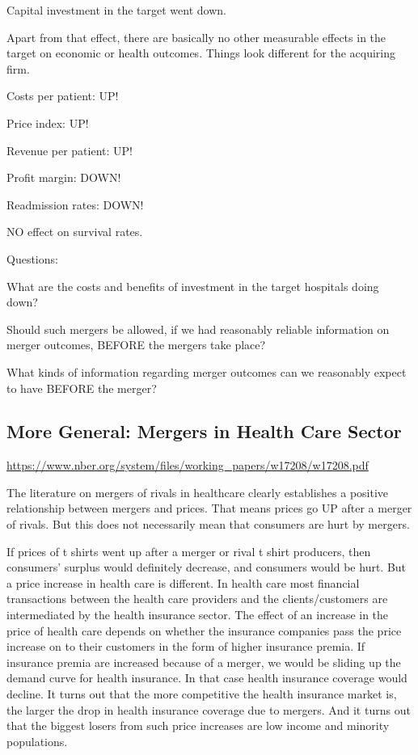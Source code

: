 \documentclass[
]{book}
\begin{document}
Capital investment in the target went down.

Apart from that effect, there are basically no other measurable effects in the target on economic or health outcomes. Things look different for the acquiring firm.

Costs per patient: UP!

Price index: UP!

Revenue per patient: UP!

Profit margin: DOWN!

Readmission rates: DOWN!

NO effect on survival rates.

Questions:

What are the costs and benefits of investment in the target hospitals doing down?

Should such mergers be allowed, if we had reasonably reliable information on merger outcomes, BEFORE the mergers take place?

What kinds of information regarding merger outcomes can we reasonably expect to have BEFORE the merger?

\hypertarget{more-general-mergers-in-health-care-sector}{%
\subsection{More General: Mergers in Health Care Sector}\label{more-general-mergers-in-health-care-sector}}

\url{https://www.nber.org/system/files/working_papers/w17208/w17208.pdf}

The literature on mergers of rivals in healthcare clearly establishes a positive relationship between mergers and prices. That means prices go UP after a merger of rivals. But this does not necessarily mean that consumers are hurt by mergers.

If prices of t shirts went up after a merger or rival t shirt producers, then consumers' surplus would definitely decrease, and consumers would be hurt. But a price increase in health care is different. In health care most financial transactions between the health care providers and the clients/customers are intermediated by the health insurance sector. The effect of an increase in the price of health care depends on whether the insurance companies pass the price increase on to their customers in the form of higher insurance premia. If insurance premia are increased because of a merger, we would be sliding up the demand curve for health insurance. In that case health insurance coverage would decline. It turns out that the more competitive the health insurance market is, the larger the drop in health insurance coverage due to mergers. And it turns out that the biggest losers from such price increases are low income and minority populations.
\end{document}
